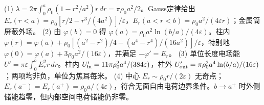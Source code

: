 (1) \(\lambda=2\pi\int_0^a\rho_0(1-r^2/a^2)r\,dr=\pi\rho_0a^2/2\)。Gauss定律给出 \(E_r(r<a)=\rho_0[r/2-r^3/(4a^2)]/\varepsilon\)，\(E_r(a<r<b)=\rho_0a^2/(4\varepsilon r)\)；金属筒屏蔽外场。
(2) 由 \(\varphi(b)=0\) 得 \(\varphi(a)=\rho_0a^2\ln(b/a)/(4\varepsilon)\)。柱内 \(\varphi(r)=\varphi(a)+\rho_0[(a^2-r^2)/4-(a^4-r^4)/(16a^2)]/\varepsilon\)，特别地 \(\varphi(0)=\varphi(a)+3\rho_0a^2/(16\varepsilon)\)，并满足 \(-\varphi'=E_r\)。
(3) 单位长度电场能 \(U'=\pi\varepsilon\int_0^b E_r^2r\,dr\)。柱内 \(U'_{\rm in}=11\pi\rho_0^2a^4/(384\varepsilon)\)，柱外 \(U'_{\rm out}=\pi\rho_0^2a^4\ln(b/a)/(16\varepsilon)\)；两项均非负，单位为焦耳每米。
(4) 中心 \(E_r\sim \rho_0r/(2\varepsilon)\) 无奇点；\(E_r(a^-)=E_r(a^+)=\rho_0a/(4\varepsilon)\)，符合无面自由电荷边界条件。\(b\to a^+\) 时外侧储能趋零，但内部空间电荷储能仍非零。
